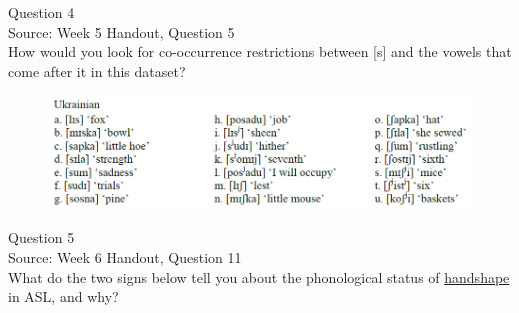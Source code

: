 \documentclass[12pt]{article}
\begin{document}
\newpage

{\large Question 4}\\

Source: Week 5 Handout, Question 5\\

How would you look for co-occurrence restrictions between [s] and the vowels that come after it in this dataset?\\

\begin{figure}[H]
\includegraphics{../images/ukrainian.png}
\end{figure}

\newpage

{\large Question 5}\\

Source: Week 6 Handout, Question 11\\

What do the two signs below tell you about the phonological status of \underline{handshape} in ASL, and why?\\
\end{document}

